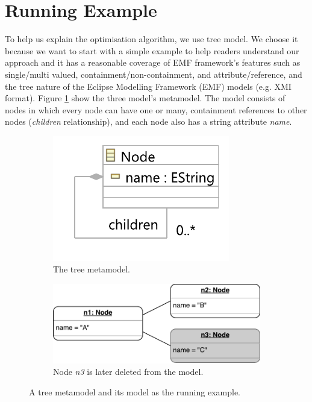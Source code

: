 \documentclass{llncs}
\begin{document}
\section{Running Example}
\label{sec:case_study}
To help us explain the optimisation algorithm, we use tree model. We choose it because we want to start with a simple example to help readers understand our approach and it has a reasonable coverage of EMF framework's features such as single/multi valued, containment/non-containment, and attribute/reference, and the tree nature of the Eclipse Modelling Framework (EMF) models (e.g. XMI format). Figure \ref{fig:node_metamodel} show the three model's metamodel. The model consists of nodes in which every node can have one or many, containment references to other nodes (\emph{children} relationship), and each node also has a string attribute \emph{name}. 

\begin{figure}[ht]	
	\begin{subfigure}[t]{0.4\linewidth}
	    \centering
		\includegraphics[width=0.8\linewidth]{node_metamodel}
    \caption{The tree metamodel.}
    \label{fig:node_metamodel}
	\end{subfigure}
	\hfill
	\begin{subfigure}[t]{0.6\linewidth}
	    \centering
		\includegraphics[width=\linewidth]{initial_chart}
\caption{Node \emph{n3} is later deleted from the model.}
\label{fig:initial_model}
	\end{subfigure}
	\caption{A tree metamodel and its model as the running example.}
	\label{fig:append_speed}
\end{figure}
\end{document}
